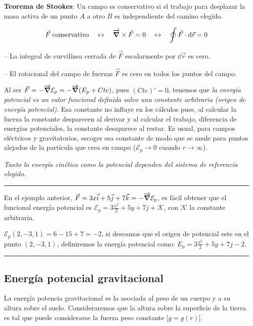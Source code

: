 \textbf{Teorema de Stookes}: Un campo es conservativo si el trabajo para desplazar la masa activa de un punto $A$ a otro $B$ es independiente del camino elegido.

\begin{equation}
\label{Th-Stookes}
	\vec F \text{\;conservativo} \quad \leftrightarrow \quad  \overrightarrow{\grad } \times \vec F = 0 \quad \leftrightarrow \quad \oint \vec F \cdot \dd \vec r =0
\end{equation}

-- La integral de curvilínea cerrada de $\vec F$ escalarmente por $\dd \vec r$ es cero.

-- El rotacional del campo de fuerzas $\vec F$ es cero en todos los puntos del campo.

Al ser $\vec F=- \overrightarrow{\grad} \mathcal E_p = - \overrightarrow{\grad} \mathcal (E_p+ Cte)$, pues $(Cte)'=0$, tenemos que \emph{la energía potencial es un valor funcional definida salvo una constante arbitraria (origen de energía potencial).} Esa constante no influye en los cálculos pues, al calcular la fuerza la constante desparecen al derivar y al calcular el trabajo, diferencia de energías potenciales, la constante desaparece al restar. Es usual, para campos eléctricos y gravitatorios, escoger esa constante de modo que se anule para puntos alejados de la partícula que crea en campo ($\mathcal E_p \to 0$ cuando $r\to \infty$).
 
 
 \emph{Tanto la energía cinética como la potencial dependen del sistema de referencia elegido.}

\rule{150pt}{0.4pt} 

En el ejemplo anterior, $\vec F = 3x\vec i + 5 \vec j+7\vec k=\displaystyle - \overrightarrow{\grad} \mathcal E_p$, es fácil obtener que el funcional energía potencial es $\mathcal E_p=3\frac{x^2}2+5y+7j+\mathcal K$, con $\mathcal K$ la constante arbitraria.

$\mathcal E_p(2,-3,1)=6-15+7=-2$, si deseamos que el origen de potencial este en el punto $(2,-3,1)$, definiremos la energía potencial como: $E_p=3\frac{x^2}2+5y+7j-2$.

\rule{150pt}{0.4pt} 



\subsection{Energía potencial gravitacional}

La energía potencia gravitacional es la asociada al peso de un cuerpo y a su altura sobre el suelo. Consideraremos que la altura sobre la superficie de la tierra es tal que puede considerarse la fuerza peso constante [$g=g(r)$].

